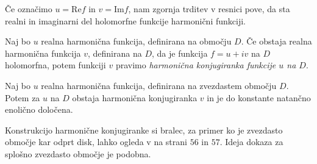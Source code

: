 \documentclass[mat1, tisk]{fmfdelo}
\begin{document}
    \begin{opomba}
        Če označimo $u = \text{Re}{f}$ in $v = \text{Im}{f}$, nam zgornja trditev v resnici pove, da sta realni in imaginarni del holomorfne funkcije harmonični funkciji. 
    \end{opomba}

    \begin{definicija}
        Naj bo $u$ realna harmonična funkcija, definirana na območju $D$. Če obstaja realna harmonična funkcija $v$, definirana na $D$, da je funkcija $f = u + iv$ na $D$ holomorfna, potem funkciji $v$ pravimo \emph{harmonična konjugiranka funkcije $u$ na $D$}.    
    \end{definicija}

    \begin{trditev}
        \label{konj}
        Naj bo $u$ realna harmonična funkcija, definirana na zvezdastem območju $D$. Potem za $u$ na $D$ obstaja harmonična konjugiranka $v$ in je do konstante natančno enolično določena. 
    \end{trditev}
    \begin{dokaz}
        Konstrukcijo harmonične konjugiranke si bralec, za primer ko je zvezdasto območje kar odprt disk, lahko ogleda v \cite{osnova} na strani $56$ in $57$. 
        Ideja dokaza za splošno zvezdasto območje je podobna. 
    \end{dokaz}
\end{document}
